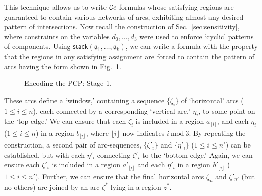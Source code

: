 \documentclass{article}
\newcommand{\set}[1]{\{#1\}}
\newcommand{\tseq}[1]{\mathfrak{#1}}
\newcommand{\stack}{\mathsf{stack}}
\newcommand{\md}[2][] {{\lfloor#2\rfloor_{#1}}}
\begin{document}
This technique allows us to write $\mathcal{C}c$-formulas whose satisfying
regions are guaranteed to contain various networks of arcs, exhibiting
almost any desired pattern of intersections. Now recall the
construction of Sec.~\ref{sec:sensitivity}, where constraints on the
variables $d_0, \ldots, d_3$ were used to enforce `cyclic' patterns of
components. Using $\stack(\tseq{a}_1,\ldots,\tseq{a}_k)$, we can
write a formula with the property that the regions in any satisfying
assignment are forced to contain the pattern of arcs having the form
shown in Fig.~\ref{fig:Summary1}.
\begin{figure}[h]
\begin{center}
\end{center}
\vspace*{-2mm}
\caption{Encoding the PCP: Stage 1.}
\label{fig:Summary1}
\end{figure}
These arcs define a `window,' containing a sequence $\set{\zeta_i}$ of
`horizontal' arcs ($1 \leq i \leq n$), each connected by a
corresponding `vertical arc,' $\eta_i$, to some point on the `top
edge.' We can ensure that each $\zeta_i$ is included in a region
$a_{\md{i}}$, and each $\eta_i$ ($1 \leq i \leq n$) in a region
$b_{\md{i}}$, where $\md{i}$ now indicates $i \ \mbox{mod}\ 3$. By
repeating the construction, a second pair of arc-sequences,
$\set{\zeta'_i}$ and $\set{\eta'_i}$ ($1 \leq i \leq n'$) can be
established, but with each $\eta'_i$ connecting $\zeta'_i$ to the
`bottom edge.' Again, we can ensure each $\zeta'_i$ is included in a
region $a'_{\md{i}}$ and each $\eta'_i$ in a region $b'_{\md{i}}$ ($1 \leq
i \leq n'$). Further, we can ensure that the final horizontal arcs
$\zeta_n$ and $\zeta'_{n'}$ (but no others) are joined by an arc
$\zeta^*$ lying in a region $z^*$.
\end{document}
